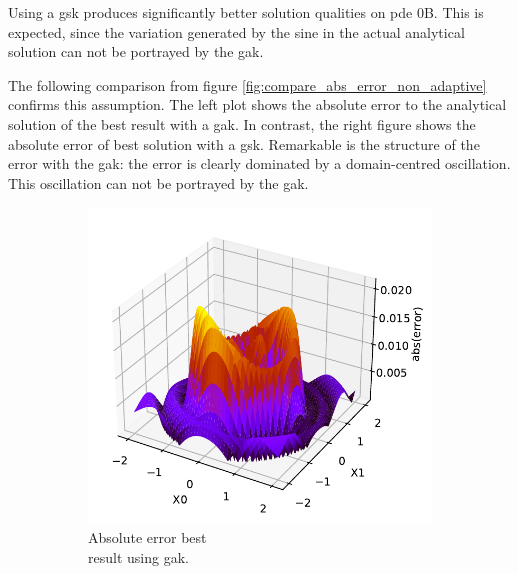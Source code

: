 \documentclass[./\jobname.tex]{subfiles}
\begin{document}
Using a \gls{gsk} produces significantly better solution qualities on \gls{pde} 0B. This is expected, since the variation generated by the sine in the actual analytical solution can not be portrayed by the \gls{gak}. 

The following comparison from figure \ref{fig:compare_abs_error_non_adaptive} confirms this assumption. The left plot shows the absolute error to the analytical solution of the best result with a \gls{gak}. In contrast, the right figure shows the absolute error of best solution with a \gls{gsk}. Remarkable is the structure of the error with the \gls{gak}: the error is clearly dominated by a domain-centred oscillation. This oscillation can not be portrayed by the \gls{gak}.  

\begin{figure}[H]
	\centering
	\begin{subfigure}[b]{0.4\linewidth}
		\centering
		\includegraphics[width=1\textwidth]{../../code/experiments/experiment_3/pde0b_ex1_abs_error.pdf}
		\caption{Absolute error best\\ result using \gls{gak}. }
		\label{fig:pde0b_ex1_abs_error}
	\end{subfigure}%
	\begin{subfigure}[b]{0.4\linewidth}
		\centering

\end{subfigure}
\end{figure}
\end{document}
